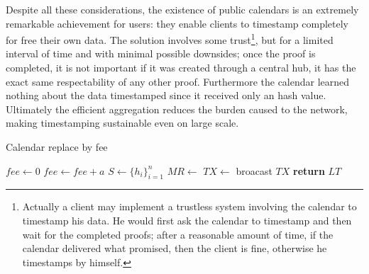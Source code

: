 Despite all these considerations, the existence of public calendars is an extremely remarkable achievement for users: they enable clients to timestamp completely for free their own data. 
The solution involves some trust\footnote{Actually a client may implement a trustless system involving the calendar to timestamp his data. He would first ask the calendar to timestamp and then wait for the completed proofs; after a reasonable amount of time, if the calendar delivered what promised, then the client is fine, otherwise he timestamps by himself.}, but for a limited interval of time and with minimal possible downsides; once the proof is completed, it is not important if it was created through a central hub, it has the exact same respectability of any other proof. 
Furthermore the calendar learned nothing about the data timestamped since it received only an hash value. 
Ultimately the efficient aggregation reduces the burden caused to the network, making timestamping sustainable even on large scale.

\begin{algorithm}
	\caption{Calendar replace by fee}
	\label{alg:calendar-rbf}
	\begin{algorithmic}[1]
		\State $fee \gets 0$
		\Repeat 
		\State $fee \gets fee + a$
		\State $S \gets \{h_i\}_{i=1}^n$ 
		\State $MR \gets$ 
		\State $TX \gets$  
		\State broacast $TX$
		\State \textbf{return} $LT$ 
		\EndProcedure
	\end{algorithmic}
\end{algorithm}